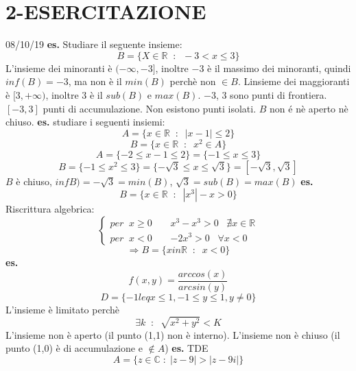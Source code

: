 \section*{2-ESERCITAZIONE}
08/10/19
\newline
\textbf{es.} Studiare il seguente insieme:
\[
    B =\{X \in \mathbb{R} \;\;:\;\; -3 < x \leq 3\}
\]
L'insieme dei minoranti è $(-\infty, -3]$, inoltre $-3$ è il massimo dei minoranti, quindi $inf(B)= -3$, ma non è il $min(B)$ perchè non $\in B$.
\newline
Linsieme dei maggioranti è $[3, + \infty)$, inoltre $3$ è il $sub(B)$ e $max(B)$.
\newline
$-3$, $3$ sono punti di frontiera.
\newline
$[-3,3]$ punti di accumulazione.
\newline
Non esistono punti isolati.
\newline
$B$ non é nè aperto nè chiuso.
\newline
\newline
\textbf{es.} studiare i seguenti insiemi:
\[
    A =\{x \in \mathbb{R} \;\;:\;\; |x-1|\leq 2\}
\]
\[
    B =\{x \in \mathbb{R} \;\;:\;\; x^2 \in A\}
\]
\[
    A =\{-2 \leq x-1 \leq 2\} = \{-1\leq x \leq 3\}
\]
\[
    B=\{-1 \leq x^2 \leq 3\} = \{-\sqrt{3} \leq x \leq \sqrt{3}\} = [-\sqrt{3}, \sqrt{3}]
\]
$B$ è chiuso, $infB) = -\sqrt{3} = min(B)$, $\sqrt{3} = sub(B) = max(B)$
\newline
\newline
\textbf{es.} 
\[
    B=\{x \in \mathbb{R} \;\;:\;\; |x^3|-x > 0\}
\]
Riscrittura algebrica:
\[
    \begin{cases}
        per \;\; x \geq 0 \;\;\;\; & x^3-x^3 > 0 \;\;\; \nexists x \in \mathbb{R} \\
        per \;\; x < 0 \;\;\;\; & -2x^3 >0 \;\;\; \forall x < 0
    \end{cases}
\]
\[
    \Rightarrow B = \{x in \mathbb{R} \;\;:\;\; x<0\}
\]
\newline
\newline
\textbf{es.} 
\[
    f(x,y) = \frac{arccos(x)}{arcsin(y)}
\]
\[
    D=\{-1  leq x \leq 1, -1 \leq y \leq 1, y \neq 0\}
\]
L'insieme è limitato perchè
\[
    \exists k \;\;:\;\; \sqrt{x^2 + y^2} < K
\]
L'insieme non è aperto (il punto (1,1) non è interno).
\newline
L'insieme non è chiuso (il punto (1,0) è di accumulazione e $\notin A$)
\newline
\newline        
\textbf{es.} TDE
\[
    A = \{z \in \mathbb{C} \;:\; |z-9| > |z-9i|\}
\]
